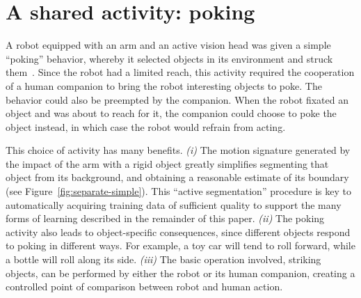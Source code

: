 \section{A shared activity: poking}

A robot equipped with an arm and an active vision head was given a
simple ``poking'' behavior, whereby it selected objects in its
environment and struck them~\citep{fitzpatrick02towards}.
Since the robot had a limited reach,
this activity required the cooperation of a human
companion to bring the robot interesting objects to poke.
The behavior could also be preempted by the companion.  When the robot
fixated an object and was about to reach for it, the companion
could choose to poke the object instead, in which case the robot
would refrain from acting.

This choice of activity has many benefits.  
%
{\em (i)}
The motion signature
generated by the impact of the arm with a rigid object greatly
simplifies segmenting that object from its background, and obtaining a
reasonable estimate of its boundary (see
Figure~\ref{fig:separate-simple}).  
This ``active segmentation''
procedure is key to automatically acquiring training data of
sufficient quality to support the many forms of learning described in
the remainder of this paper.
%
{\em (ii)}
The poking activity also leads to object-specific consequences, since
different objects respond to poking in different ways.  For example,
a toy car will tend to roll forward, while a bottle will roll along its
side.
%
{\em (iii)}
The basic operation involved, striking objects, can be performed
by either the robot or its human companion, creating a
controlled point of 
comparison between robot and human action.


%



